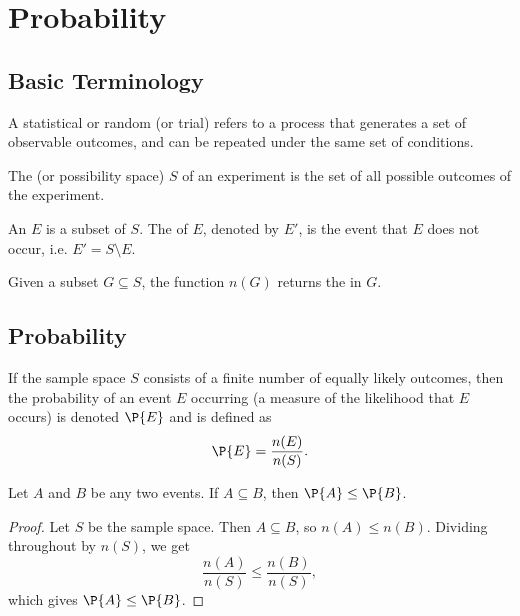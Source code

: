 \chapter{Probability}\label{chap:Probability}

\section{Basic Terminology}

\begin{definition}
    A statistical or random  (or trial) refers to a process that generates a set of observable outcomes, and can be repeated under the same set of conditions.
\end{definition}

\begin{definition}
    The  (or possibility space) $S$ of an experiment is the set of all possible outcomes of the experiment.
\end{definition}

\begin{definition}
    An  $E$ is a subset of $S$. The  of $E$, denoted by $E'$, is the event that $E$ does not occur, i.e. $E' = S \setminus E$.
\end{definition}

\begin{definition}
    Given a subset $G \subseteq S$, the function $n(G)$ returns the  in $G$.
\end{definition}

\section{Probability}

\begin{definition}
    If the sample space $S$ consists of a finite number of equally likely outcomes, then the probability of an event $E$ occurring (a measure of the likelihood that $E$ occurs) is denoted $\P{E}$ and is defined as \[\P{E} = \frac{n(E)}{n(S)}.\]
\end{definition}

\begin{proposition}
    Let $A$ and $B$ be any two events. If $A \subseteq B$, then $\P{A} \leq \P{B}$.
\end{proposition}
\begin{proof}
    Let $S$ be the sample space. Then $A \subseteq B$, so $n(A) \leq n(B)$. Dividing throughout by $n(S)$, we get \[\frac{n(A)}{n(S)} \leq \frac{n(B)}{n(S)},\] which gives $\P{A} \leq \P{B}$.
\end{proof}

